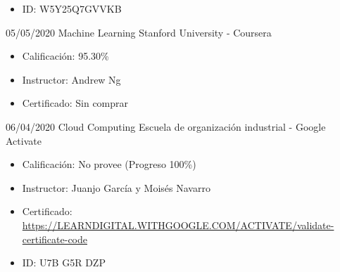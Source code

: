 \begin{entrylist}
{\begin{itemize}
		        \item ID: W5Y25Q7GVVKB
		    \end{itemize}
		}
	\entry
		{05/05/2020}
		{Machine Learning}
		{Stanford University - Coursera}
		{
		    \vspace{-5mm}
		    \begin{itemize}
		        \setlength\itemsep{0pt}
		        \item Calificación: 95.30\%
		        \item Instructor: Andrew Ng
		        \item Certificado: Sin comprar
		    \end{itemize}
		}
	\entry
		{06/04/2020}
		{Cloud Computing}
		{Escuela de organización industrial - Google Activate}
		{
		    \vspace{-5mm}
		    \begin{itemize}
		        \setlength\itemsep{0pt}
		        \item Calificación: No provee (Progreso 100\%)
		        \item Instructor: Juanjo García y Moisés Navarro
		        \item Certificado: {\href{https://LEARNDIGITAL.WITHGOOGLE.COM/ACTIVATE/validate-certificate-code}{https://LEARNDIGITAL.WITHGOOGLE.COM/ACTIVATE/validate-certificate-code}}
		        \item ID: U7B G5R DZP
		    \end{itemize}
		}
\end{entrylist}